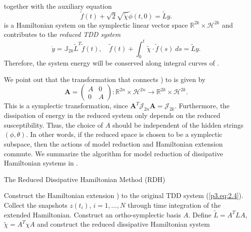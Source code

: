 together with the auxiliary equation
\begin{equation} \label{p3.eq:3.13}
	\tilde f(t) + \sqrt{2} \sqrt{\tilde \chi} \tilde \phi(t,0) = \tilde L y.
\end{equation}
 is a Hamiltonian system on the symplectic linear vector space $\mathbb R^{2k} \times \mathcal H^{2k}$ and contributes to the \emph{reduced TDD system}
\begin{equation} \label{p3.eq:3.14}
	\dot {y} = \mathbb J_{2k} \tilde L^T \tilde f(t), \quad \tilde f(t) + \int_0^t \tilde \chi\cdot \tilde f(s)\ ds = \tilde L y.
\end{equation}
Therefore, the system energy will be conserved along integral curves of .

We point out that the transformation that connects ) to  is given by
\begin{equation}
	\mathbf A = \begin{pmatrix}
		A& 0 \\
		0& A
	\end{pmatrix} : \mathbb R^{2n} \times \mathcal H^{2n} \to \mathbb R^{2k} \times \mathcal H^{2k}.
\end{equation}
This is a symplectic transformation, since $\mathbf A^T \mathcal J_{2n} \mathbf A = \mathcal J_{2k}$. Furthermore, the dissipation of energy in the reduced system only depends on the reduced susceptibility. Thus, the choice of $A$ should be independent of the hidden strings $(\phi, \theta)$. In other words, if the reduced space is chosen to be a symplectic subspace, then the actions of model reduction and Hamiltonian extension commute. We summarize the algorithm for model reduction of dissipative Hamiltonian systems in .

\begin{algorithm} 
\caption{The Reduced Dissipative Hamiltonian Method (RDH)} \label{alg:6.1}
\begin{algorithmic} [1]
	\State Construct the Hamiltonian extension ) to the original TDD system (\ref{p3.eq:2.4}).
	\State Collect the snapshots $z(t_i)$, $i=1,\dots,N$ through time integration of the extended Hamiltonian.
	\State Construct an ortho-symplectic basis $A$.
	\State Define $\tilde L = A^T L A$, $\tilde \chi = A^T \chi A$ and construct the reduced dissipative Hamiltonian system 
\end{algorithmic}
\vspace{0.5cm}
\end{algorithm}

